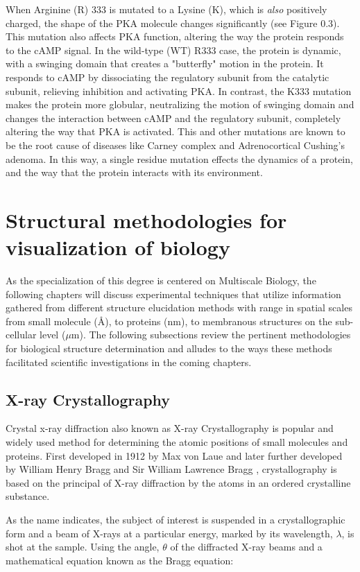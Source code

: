 \documentclass[12pt]{ucsddissertation}
\begin{document}
\begin{dissertationintroduction}
 When Arginine (R) 333 is mutated to a Lysine (K), which is \textit{also} positively charged, the shape of the PKA molecule changes significantly (see Figure 0.3). This mutation also affects PKA function, altering the way the protein responds to the cAMP signal. In the wild-type (WT) R333 case, the protein is dynamic, with a swinging domain that creates a "butterfly" motion in the protein. It responds to cAMP by dissociating the regulatory subunit from the catalytic subunit, relieving inhibition and activating PKA. In contrast, the K333 mutation makes the protein more globular, neutralizing the motion of swinging domain\cite{Cheng2009} and changes the interaction between cAMP and the regulatory subunit, completely altering the way that PKA is activated. This and other mutations are known to be the root cause of diseases like Carney complex\cite{Kirschner2000} and Adrenocortical Cushing's adenoma\cite{Calebiro2014}. In this way, a single residue mutation effects the dynamics of a protein, and the way that the protein interacts with its environment. 

\section{Structural methodologies for visualization of biology}
As the specialization of this degree is centered on Multiscale Biology, the following chapters will discuss experimental techniques that utilize information gathered from different structure elucidation methods with range in spatial scales from small molecule (\si{\angstrom}), to proteins (nm), to membranous structures on the sub-cellular level ($\mu$m). The following subsections review the pertinent methodologies for biological structure determination and alludes to the ways these methods facilitated scientific investigations in the coming chapters. 

\subsection{X-ray Crystallography}
Crystal x-ray diffraction also known as X-ray Crystallography is popular and widely used method for determining the atomic positions of small molecules and proteins. First developed in 1912 by Max von Laue and later further developed by William Henry Bragg and Sir William Lawrence Bragg \cite{Bragg2014}, crystallography is based on the principal of X-ray diffraction by the atoms in an ordered crystalline substance. 

As the name indicates, the subject of interest is suspended in a crystallographic form and a beam of X-rays at a particular energy, marked by its wavelength, $\lambda$, is shot at the sample. Using the angle, $\theta$ of the diffracted X-ray beams and a mathematical equation known as the Bragg equation: 


\end{dissertationintroduction}
\end{document}
